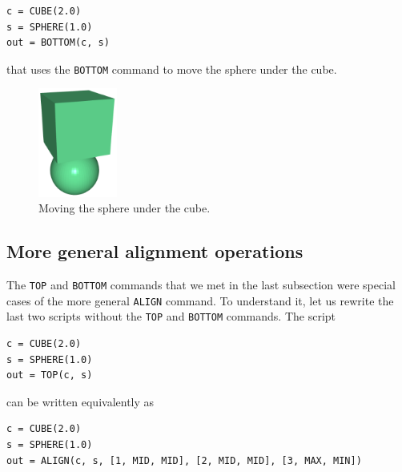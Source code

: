 \begin{bbox}
\begin{verbatim}
c = CUBE(2.0)
s = SPHERE(1.0)
out = BOTTOM(c, s)
\end{verbatim}
\end{bbox}
\vspace{6mm}

\noindent
that uses the {\tt BOTTOM} command to move the sphere 
under the cube.

\begin{figure}[!ht]
\begin{center}
\includegraphics[width=0.23\textwidth]{img/bottom-1.png}
\end{center}
\vspace{-4mm}
\caption{Moving the sphere under the cube.}
\label{fig:bottom-1}
\end{figure}
\noindent

\subsection{More general alignment operations}

The {\tt TOP} and {\tt BOTTOM} commands that we met in the last subsection 
were special cases of the more general {\tt ALIGN} command. To understand it, 
let us rewrite the last two scripts without the {\tt TOP} and {\tt BOTTOM}
commands. The script \\

\begin{bbox}
\begin{verbatim}
c = CUBE(2.0)
s = SPHERE(1.0)
out = TOP(c, s)
\end{verbatim}
\end{bbox}
\vspace{6mm}

\noindent
can be written equivalently as\\

\begin{bbox}
\begin{verbatim}
c = CUBE(2.0)
s = SPHERE(1.0)
out = ALIGN(c, s, [1, MID, MID], [2, MID, MID], [3, MAX, MIN])
\end{verbatim}
\end{bbox}
\vspace{6mm}

